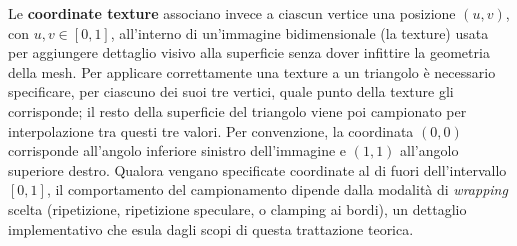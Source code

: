 Le \textbf{coordinate texture} associano invece a ciascun vertice una posizione $(u, v)$, con $u, v \in [0, 1]$, all'interno di un'immagine bidimensionale (la texture) usata per aggiungere dettaglio visivo alla superficie senza dover infittire la geometria della mesh. Per applicare correttamente una texture a un triangolo è necessario specificare, per ciascuno dei suoi tre vertici, quale punto della texture gli corrisponde; il resto della superficie del triangolo viene poi campionato per interpolazione tra questi tre valori. Per convenzione, la coordinata $(0,0)$ corrisponde all'angolo inferiore sinistro dell'immagine e $(1,1)$ all'angolo superiore destro. Qualora vengano specificate coordinate al di fuori dell'intervallo $[0,1]$, il comportamento del campionamento dipende dalla modalità di \emph{wrapping} scelta (ripetizione, ripetizione speculare, o clamping ai bordi), un dettaglio implementativo che esula dagli scopi di questa trattazione teorica.
